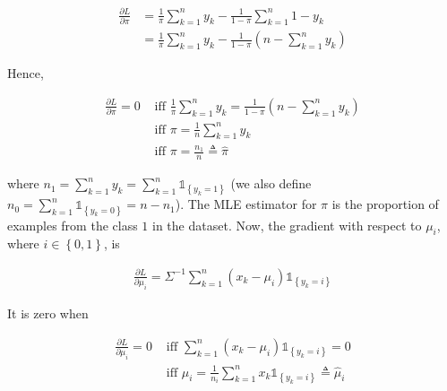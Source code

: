\documentclass[a4paper, 11pt]{article}
\begin{document}
\begin{enumerate}[label=\alph*]
    \begin{equation*}
        \begin{aligned}
        \frac{\partial L}{\partial \pi} &= \frac{1}{\pi} \sum_{k=1}^{n} y_{k} - \frac{1}{1 - \pi} \sum_{k=1}^{n} 1 - y_{k} \\
        &= \frac{1}{\pi} \sum_{k=1}^{n} y_{k} - \frac{1}{1 - \pi} \left( n - \sum_{k=1}^{n} y_{k} \right)
        \end{aligned}
    \end{equation*}
    
    Hence, 
    
    \begin{equation*}
        \begin{aligned}
        \frac{\partial L}{\partial \pi} = 0 &\text{ iff } \frac{1}{\pi} \sum_{k=1}^{n} y_{k} = \frac{1}{1 - \pi} \left( n - \sum_{k=1}^{n} y_{k} \right) \\
        &\text{ iff } \pi = \frac{1}{n} \sum_{k=1}^{n} y_{k} \\
        &\text{ iff } \pi = \frac{n_{1}}{n} \triangleq \widehat{\pi}
        \end{aligned}
    \end{equation*}
    
    where $n_{1} = \sum_{k=1}^{n} y_{k} = \sum_{k=1}^{n} \mathds{1}_{\left\{ y_{k} = 1 \right\}}$ (we also define $n_{0} = \sum_{k=1}^{n} \mathds{1}_{\left\{ y_{k} = 0 \right\}} = n - n_{1}$). The MLE estimator for $\pi$ is the proportion of examples from the class $1$ in the dataset. Now, the gradient with respect to $\mu_{i}$, where $i \in \left\{ 0, 1 \right\}$, is
    
    \begin{equation*}
        \begin{aligned}
        \frac{\partial L}{\partial \mu_{i}} = \Sigma^{-1} \sum_{k=1}^{n} \left( x_{k} - \mu_{i} \right) \mathds{1}_{\left\{ y_k = i \right\}}
        \end{aligned}
    \end{equation*}
    
    It is zero when
    
    \begin{equation*}
        \begin{aligned}
        \frac{\partial L}{\partial \mu_{i}} = 0 &\text{ iff } \sum_{k=1}^{n} \left( x_{k} - \mu_{i} \right) \mathds{1}_{\left\{ y_{k} = i \right\}} = 0 \\
        &\text{ iff } \mu_{i} = \frac{1}{n_{i}} \sum_{k=1}^{n} x_{k} \mathds{1}_{\left\{ y_{k} = i \right\}} \triangleq \widehat{\mu}_{i}
        \end{aligned}
    \end{equation*}
    

\end{enumerate}
\end{document}
